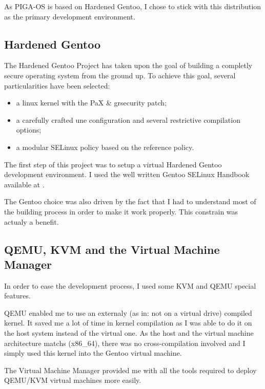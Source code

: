 \documentclass[pdftex,a4paper,titlepage,11pt]{article}
\begin{document}
\smallskip

As PIGA-OS is based on Hardened Gentoo, I chose to stick with this distribution
as the primary development environment.

\subsection{Hardened Gentoo}

The Hardened Gentoo Project has taken upon the goal of building a completly
secure operating system from the ground up. To achieve this goal, several
particularities have been selected:
\begin{itemize}
	\item a linux kernel with the PaX \& grsecurity patch;
	\item a carefully crafted une configuration and several restrictive
compilation options;
	\item a modular SELinux policy based on the reference policy.
\end{itemize}

\smallskip

The first step of this project was to setup a virtual Hardened Gentoo
development environment. I used the well written Gentoo SELinux Handbook
available at \cite{GSELH}.

\bigskip

The Gentoo choice was also driven by the fact that I had to understand most of
the building process in order to make it work properly. This constrain was
actualy a benefit.

\subsection{QEMU, KVM and the Virtual Machine Manager}

In order to ease the development process, I used some KVM and QEMU special
features.

\bigskip

QEMU enabled me to use an externaly (as in: not on a virtual drive) compiled
kernel. It saved me a lot of time in kernel compilation as I was able to do it
on the host system instead of the virtual one. As the host and the virtual
machine architecture matchs (x86\_64), there was no cross-compilation involved
and I simply used this kernel into the Gentoo virtual machine.

\bigskip

The Virtual Machine Manager provided me with all the tools required to deploy
QEMU/KVM virtual machines more easily.
\end{document}
